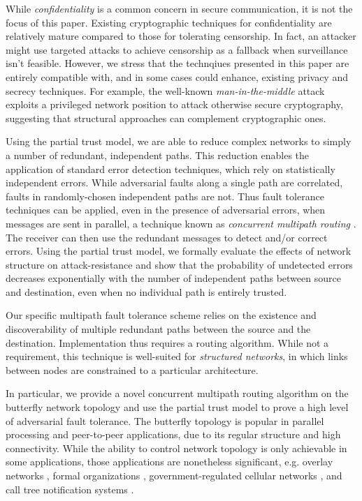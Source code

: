 \documentclass{sig-alternate-05-2015}
\begin{document}
While {\em confidentiality} is a common concern in secure communication,
it is not the focus of this paper.
Existing cryptographic techniques for confidentiality are relatively
mature compared to those for tolerating censorship.
In fact, an attacker might use targeted attacks to achieve censorship
as a fallback when surveillance isn't feasible.
However, we stress that the technqiues presented in this paper
are entirely compatible with, and in some cases could enhance, existing
privacy and secrecy techniques.
For example, the well-known {\em man-in-the-middle} attack exploits a privileged
network position to attack otherwise secure cryptography,
suggesting that structural approaches can complement cryptographic ones.

Using the partial trust model, we are able to reduce complex networks to
simply a number of redundant, independent paths.
This reduction enables the application of standard error detection techniques,
which rely on statistically independent errors.
While adversarial faults along a single path are correlated,
faults in randomly-chosen independent paths are not.
Thus fault tolerance techniques can be applied,
even in the presence of adversarial errors,
when messages are sent in parallel,
a technique known as {\em concurrent multipath routing}
\cite{zin_survey_2015, qadir_exploiting_2015}.
The receiver can then use the redundant messages to detect and/or correct
errors.
Using the partial trust model, we formally evaluate the 
effects of network structure on attack-resistance and show that the probability
of undetected errors decreases exponentially with the number of
independent paths between source and destination,
even when no individual path is entirely trusted.

Our specific multipath fault tolerance scheme relies on the existence
and discoverability of multiple redundant paths between the source and
the destination.
Implementation thus requires a routing algorithm.
While not a requirement, this technique is well-suited for
{\em structured networks},
in which links between nodes are constrained to a particular architecture.

In particular, we provide a novel concurrent multipath routing algorithm
on the butterfly network topology and use the partial trust model to prove
a high level of adversarial fault tolerance.
The butterfly topology is popular in parallel processing
\cite{kshemkalyani_distributed_2008} and
peer-to-peer \cite{lua_survey_2005, korzun_structured_2013}
applications, due to its regular structure and high connectivity.
While the ability to control network topology is only achievable in some
applications, those applications are nonetheless significant,
e.g. overlay networks \cite{lua_survey_2005, korzun_structured_2013},
formal organizations \cite{mohr_explaining_1982},
government-regulated cellular networks \cite{walker_mass_2012},
and call tree notification systems \cite{nickerson_thinking_2010}.
\end{document}
